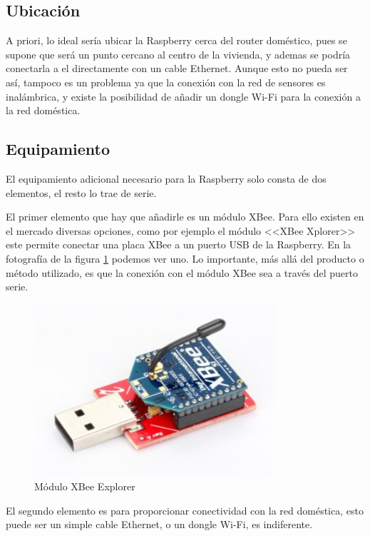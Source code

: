 \subsection{Ubicación}
A priori, lo ideal sería ubicar la Raspberry cerca del router doméstico, pues se supone que será un punto cercano al centro de la vivienda, y ademas se podría conectarla a el directamente con un cable Ethernet. Aunque esto no pueda ser así, tampoco es un problema ya que la conexión con la red de sensores es inalámbrica, y existe la posibilidad de añadir un dongle Wi-Fi para la conexión a la red doméstica.

\subsection{Equipamiento}

El equipamiento adicional necesario para la Raspberry solo consta de dos elementos, el resto lo trae de serie.

El primer elemento que hay que añadirle es un módulo XBee. Para ello existen en el mercado diversas opciones, como por ejemplo el módulo <<XBee Xplorer>> este permite conectar una placa XBee a un puerto USB de la Raspberry. En la fotografía de la figura \ref{fig:foto_xbeexplorer} podemos ver uno. Lo importante, más allá del producto o método utilizado, es que la conexión con el módulo XBee sea a través del puerto serie.

\begin{figure}[htbp]
    \centering
    \includegraphics[width=0.80\textwidth]{imagenes/xbeexplorer.jpg}
    \caption{Módulo XBee Explorer}
    \label{fig:foto_xbeexplorer}
\end{figure}

El segundo elemento es para proporcionar conectividad con la red doméstica, esto puede ser un simple cable Ethernet, o un dongle Wi-Fi, es indiferente.


